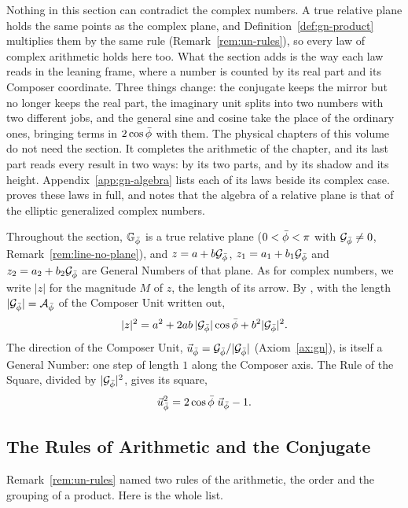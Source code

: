 Nothing in this section can contradict the complex numbers. A true relative plane holds the same points as the complex plane, and Definition~\ref{def:gn-product} multiplies them by the same rule (Remark~\ref{rem:un-rules}), so every law of complex arithmetic holds here too. What the section adds is the way each law reads in the leaning frame, where a number is counted by its real part and its Composer coordinate. Three things change: the conjugate keeps the mirror but no longer keeps the real part, the imaginary unit splits into two numbers with two different jobs, and the general sine and cosine take the place of the ordinary ones, bringing terms in $2\cos\bar{\phi}$ with them. The physical chapters of this volume do not need the section. It completes the arithmetic of the chapter, and its last part reads every result in two ways: by its two parts, and by its shadow and its height. Appendix~\ref{app:gn-algebra} lists each of its laws beside its complex case. \citet[Sections~4 and~5]{DerrazGNPreprint2026} proves these laws in full, and notes that the algebra of a relative plane is that of the elliptic generalized complex numbers.

Throughout the section, $\mathbb{G}_{\bar{\phi}}$ is a true relative plane ($0 < \bar{\phi} < \pi$ with $\mathcal{G}_{\bar{\phi}} \neq 0$, Remark~\ref{rem:line-no-plane}), and $z = a + b\mathcal{G}_{\bar{\phi}}$, $z_1 = a_1 + b_1\mathcal{G}_{\bar{\phi}}$ and $z_2 = a_2 + b_2\mathcal{G}_{\bar{\phi}}$ are General Numbers of that plane. As for complex numbers, we write $|z|$ for the magnitude $M$ of $z$, the length of its arrow. By , with the length $|\mathcal{G}_{\bar{\phi}}| = \mathcal{A}_{\bar{\phi}}$ of the Composer Unit written out,
\[
|z|^2 = a^2 + 2ab\,|\mathcal{G}_{\bar{\phi}}|\cos\bar{\phi} + b^2|\mathcal{G}_{\bar{\phi}}|^2 .
\]
The direction of the Composer Unit, $\vec{u}_{\bar{\phi}} = \mathcal{G}_{\bar{\phi}}/|\mathcal{G}_{\bar{\phi}}|$ (Axiom~\ref{ax:gn}), is itself a General Number: one step of length $1$ along the Composer axis. The Rule of the Square, divided by $|\mathcal{G}_{\bar{\phi}}|^2$, gives its square,
\[
\vec{u}_{\bar{\phi}}^2 = 2\cos\bar{\phi}\;\vec{u}_{\bar{\phi}} - 1 .
\]

\subsection{The Rules of Arithmetic and the Conjugate}\label{subsec:gn-conjugate}

Remark~\ref{rem:un-rules} named two rules of the arithmetic, the order and the grouping of a product. Here is the whole list.

